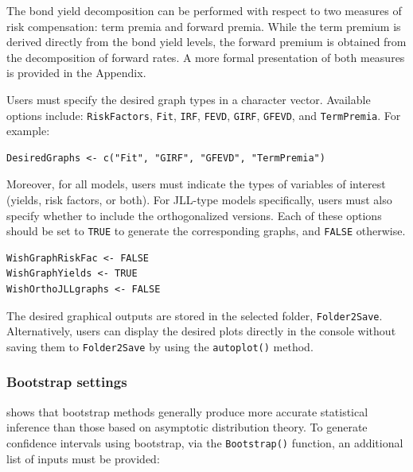 The bond yield decomposition can be performed with respect to two measures of risk compensation: term premia and forward premia. While the term premium is derived directly from the bond yield levels, the forward premium is obtained from the decomposition of forward rates. A more formal presentation of both measures is provided in the Appendix.

Users must specify the desired graph types in a character vector. Available options include: \texttt{RiskFactors}, \texttt{Fit}, \texttt{IRF}, \texttt{FEVD}, \texttt{GIRF}, \texttt{GFEVD}, and \texttt{TermPremia}. For example:

\begin{verbatim}
DesiredGraphs <- c("Fit", "GIRF", "GFEVD", "TermPremia")
\end{verbatim}

Moreover, for all models, users must indicate the types of variables of interest (yields, risk factors, or both). For JLL-type models specifically, users must also specify whether to include the orthogonalized versions. Each of these options should be set to \texttt{TRUE} to generate the corresponding graphs, and \texttt{FALSE} otherwise.

\begin{verbatim}
WishGraphRiskFac <- FALSE
WishGraphYields <- TRUE
WishOrthoJLLgraphs <- FALSE
\end{verbatim}

The desired graphical outputs are stored in the selected folder, \texttt{Folder2Save}. Alternatively, users can display the desired plots directly in the console without saving them to \texttt{Folder2Save} by using the \texttt{autoplot()} method.

\subsubsection{Bootstrap settings}\label{S:SectionBootstrap}

\citet{Horowitz2019} shows that bootstrap methods generally produce more accurate statistical inference than those based on asymptotic distribution theory. To generate confidence intervals
using bootstrap, via the \texttt{Bootstrap()} function, an additional list of inputs must be provided:

